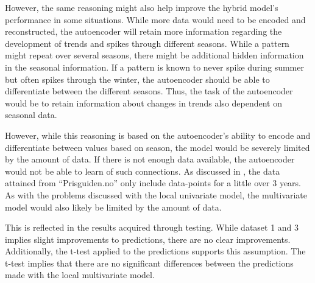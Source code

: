 However, the same reasoning might also help improve the hybrid model's performance in some situations.
While more data would need to be encoded and reconstructed, the autoencoder will retain more information
regarding the development of trends and spikes through different seasons.
While a pattern might repeat over several seasons, there might be additional hidden information in the seasonal information.
If a pattern is known to never spike during summer but often spikes through the winter,
the autoencoder should be able to differentiate between the different seasons.
Thus, the task of the autoencoder would be to retain information about changes in trends also dependent on seasonal data.


However, while this reasoning is based on the autoencoder's ability to encode and differentiate between values based on season,
the model would be severely limited by the amount of data.
If there is not enough data available, the autoencoder would not be able to learn of such connections.
As discussed in , the data attained from ``Prisguiden.no'' only include data-points
for a little over 3 years.
As with the problems discussed with the local univariate model, the multivariate model would also likely be limited by the amount of data.

This is reflected in the results acquired through testing.
While dataset 1 and 3 implies slight improvements to predictions, there are no clear improvements.
Additionally, the t-test applied to the predictions supports this assumption.
The t-test implies that there are no significant differences between the predictions made with the local multivariate model.


